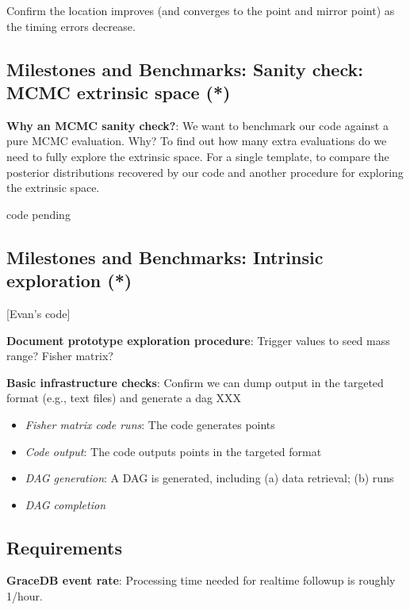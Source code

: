 \documentclass[twocolumn,prd,nofootinbib]{revtex4}
\newcommand\editremark[1]{{\color{red} #1}}
\begin{document}
\begin{widetext}
\begin{widetext}
\begin{itemize}
 Confirm the location improves (and  converges to the point and mirror point) as the timing errors decrease.
\end{itemize}

\subsection{Milestones and Benchmarks: Sanity check: MCMC extrinsic space (*)}

\noindent \textbf{Why an MCMC  sanity check?}: We want to benchmark our code against a pure MCMC evaluation. Why?  To
find out how many
extra evaluations do we need to fully explore the extrinsic space.  For a single template, to compare the posterior distributions recovered by
our code and another procedure for exploring the extrinsic space.


\editremark{code pending}


\subsection{Milestones and Benchmarks:  Intrinsic exploration (*)}

[Evan's code]

\noindent \textbf{Document prototype exploration procedure}: Trigger values to seed mass range? Fisher matrix?


\noindent \textbf{Basic infrastructure checks}: Confirm we can dump output in the targeted format (e.g., text files) and
generate a dag \editremark{XXX}
\begin{itemize}
\item \emph{Fisher matrix code runs}: The code generates points
\item \emph{Code output}: The code outputs points in the targeted format
\item \emph{DAG generation}: A DAG is generated, including (a) data retrieval; (b) runs

\item \emph{DAG completion}
\end{itemize}




\end{widetext}
\subsection{Requirements}

\noindent \textbf{GraceDB event rate}: Processing time needed for realtime followup is roughly 1/hour.


\end{widetext}
\end{document}
